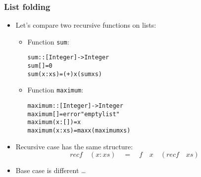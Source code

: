 \documentclass[final,handout]{beamer}
\begin{document}
\begin{frame}[fragile]
    \frametitle{List folding}

    \begin{itemize}
        \item Let's compare two recursive functions on lists:

        \begin{itemize}
            \item Function \texttt{sum}:
            \begin{alltt}
    sum :: [Integer] -> Integer
    sum []           = 0
    {\color{green}sum (x : xs)     = (+) x (sum xs)}
            \end{alltt}

        \item Function \texttt{maximum}:
            \begin{alltt}
    maximum :: [Integer] -> Integer
    maximum []       = error "empty list"
    maximum (x : []) = x
    maximum (x : xs) = max x (maximum xs)
            \end{alltt}
        \end{itemize}

        \item Recursive case has the same structure:
            $$
            recf \quad (x:xs) \quad = \quad f \quad x \quad (recf \quad xs)
            $$
        \item<2-> Base case is different \dots

    \end{itemize}
\end{frame}
\end{document}
